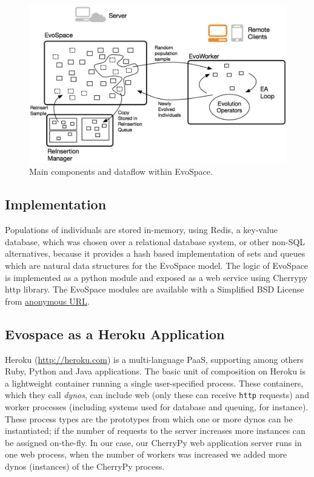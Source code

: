 \documentclass{sig-alternate}
\begin{document}
\begin{figure}[t]
    \centering
        \includegraphics[width=4.5in]{eps/evospaceExample.eps}
    \caption{Main components and dataflow within EvoSpace.}
    \label{fig:evo}
\end{figure}


\subsection{Implementation}
Populations of individuals are stored in-memory, using Redis, a
key-value database, which 
 was chosen over a relational database system, or other non-SQL 
alternatives, because it provides a hash based implementation of sets 
and queues which are natural data structures for the EvoSpace model. 
The logic of EvoSpace is implemented as a python module and exposed as a web 
service using Cherrypy http library. The EvoSpace modules are available with 
a Simplified BSD License from 
\url{anonymous URL}.



\subsection{Evospace as a Heroku Application}

Heroku (\url{http://heroku.com}) is a multi-language PaaS, supporting among others
Ruby, Python and Java applications. The basic unit of composition on
Heroku is a lightweight container running a single user-specified
process. These containers, which they call {\em dynos}, can include web
(only these can receive {\tt http} requests) and worker processes
(including systems used for database and queuing, for instance).
These  process types are the prototypes from which one or more dynos 
can be instantiated; if the number of requests to the server increases
more instances can be assigned on-the-fly. In our case, our CherryPy 
web application server runs in one web process, when the number 
of workers was increased we added more dynos (instances) of the 
CherryPy process.
\end{document}
